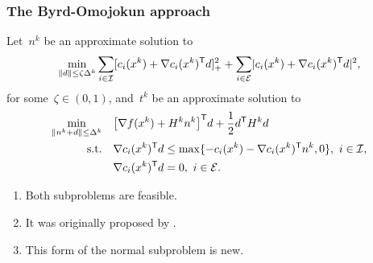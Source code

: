 \documentclass{polyu-presentation}
\newcommand{\con}[1]{c_{#1}}
\newcommand{\ieq}{\mathcal{E}}
\newcommand{\iub}{\mathcal{I}}
\newcommand{\obj}{f}
\begin{document}
\begin{frame}
    \frametitle{The Byrd-Omojokun approach}

    Let~$n^k$ be an approximate solution to
    \begin{equation*}
        \min_{\norm{d} \le \zeta \Delta^k} \sum_{i \in \iub} \posp{\con{i}(x^k) + \nabla \con{i}(x^k)^{\T} d}^2 + \sum_{i \in \ieq} \abs{\con{i}(x^k) + \nabla \con{i}(x^k)^{\T} d}^2,
    \end{equation*}
    for some~$\zeta \in (0, 1)$, and~$t^k$ be an approximate solution to
    \begin{align*}
        \min_{\norm{n^k + d} \le \Delta^k}  & \quad \big[ \nabla \obj(x^k) + H^k n^k \big]^{\T} d + \frac{1}{2} d^{\T} H^k d\\
        \text{s.t.}                         & \quad \nabla \con{i}(x^k)^{\T} d \le \max \set{- \con{i}(x^k) - \nabla \con{i}(x^k)^{\T} n^k, 0}, ~ i \in \iub,\\
                                            & \quad \nabla \con{i}(x^k)^{\T} d = 0, ~ i \in \ieq.
    \end{align*}

    \begin{block}{}
        \begin{enumerate}[<+(1)->]
            \item Both subproblems are \alert{feasible}.
            \item It was originally \alert{proposed} by \cite{Byrd_1987,Omojokun_1989}.
            \item This form of the normal subproblem is \alert{new}.
        \end{enumerate}
    \end{block}
\end{frame}
\end{document}
